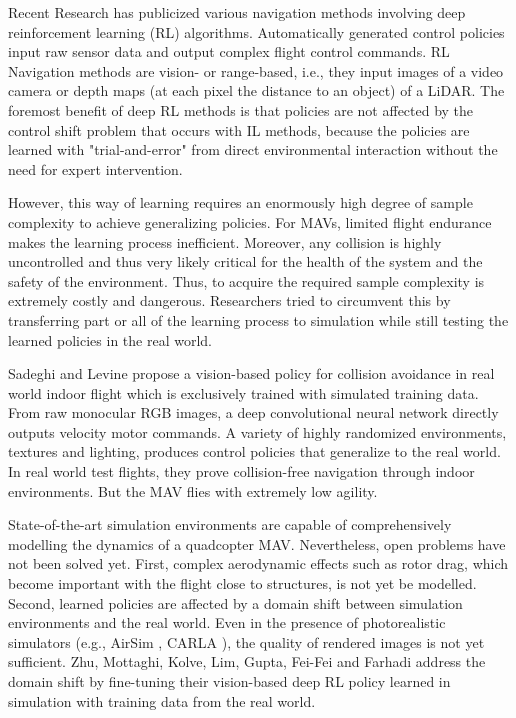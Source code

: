 
Recent Research has publicized various navigation methods involving deep reinforcement learning (RL) algorithms.
Automatically generated control policies input raw sensor data and output complex flight control commands.
RL Navigation methods are vision- or range-based, 
i.e., they input images of a video camera or depth maps (at each pixel the distance to an object) of a LiDAR.
The foremost benefit of deep RL methods is that policies are not affected by the control shift problem that occurs with IL methods,
because the policies are learned with "trial-and-error" \cite{Sadeghi2016} from direct environmental interaction without the need for expert intervention.

However, this way of learning requires an enormously high degree of sample complexity to achieve generalizing policies. \cite{Zhu2017}
For MAVs, limited flight endurance makes the learning process inefficient. \cite{Sadeghi2016}
Moreover, any collision is highly uncontrolled and thus very likely critical for the health of the system and the safety of the environment. \cite{Sadeghi2016}
Thus, to acquire the required sample complexity is extremely costly and dangerous. 
Researchers tried to circumvent this by transferring part or all of the learning process to simulation 
while still testing the learned policies in the real world. 

Sadeghi and Levine \cite{Sadeghi2016} propose a vision-based policy for collision avoidance in real world indoor flight 
which is exclusively trained with simulated training data.
From raw monocular RGB images, a deep convolutional neural network directly outputs velocity motor commands.
A variety of highly randomized environments, textures and lighting, produces control policies that generalize to the real world.
In real world test flights, they prove collision-free navigation through indoor environments. 
But the MAV flies with extremely low agility.

State-of-the-art simulation environments are capable of comprehensively modelling the dynamics of a quadcopter MAV. \cite{Meyer2012}
Nevertheless, open problems have not been solved yet.
First, complex aerodynamic effects such as rotor drag, which become important with the flight close to structures, is not yet be modelled. \cite{Faessler2018}
Second, learned policies are affected by a domain shift between simulation environments and the real world.
Even in the presence of photorealistic simulators (e.g., AirSim \cite{Shah2017}, CARLA \cite{Dosovitskiy2017}),
the quality of rendered images is not yet sufficient.
Zhu, Mottaghi, Kolve, Lim, Gupta, Fei-Fei and Farhadi \cite{Zhu2017} address the domain shift by fine-tuning 
their vision-based deep RL policy learned in simulation with training data from the real world.












